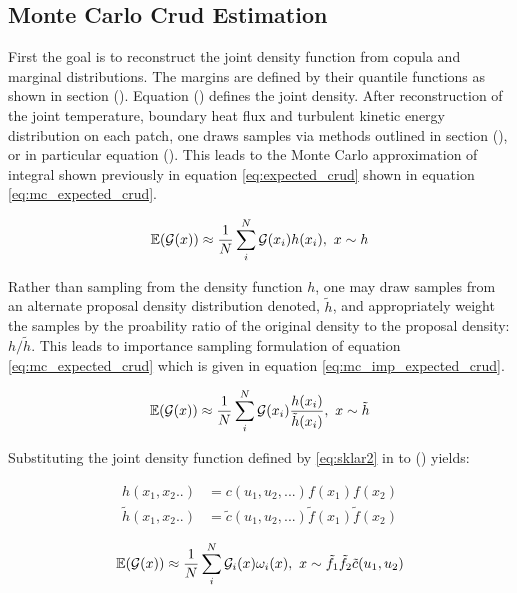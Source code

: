 

\subsection{Monte Carlo Crud Estimation}


First the goal is to reconstruct the joint density function from copula and marginal distributions.  The margins are defined by their quantile functions as shown in section ().  Equation () defines the joint density. After reconstruction of the joint temperature, boundary heat flux and turbulent kinetic energy distribution on each patch, one draws samples via methods outlined in section (), or in particular equation ().  This leads to the Monte Carlo approximation of integral shown previously in equation \ref{eq:expected_crud} shown in equation \ref{eq:mc_expected_crud}.

\begin{equation}
\operatorname*{\mathbb{E}}(\mathcal G(x)) \approx \frac{1}{N} \sum_i^N \mathcal G(x_i) h(x_i), \ x \sim {h}
\label{eq:mc_expected_crud}
\end{equation}

Rather than sampling from the density function $h$, one may draw samples from an alternate proposal density distribution denoted, $\tilde h$, and appropriately weight the samples by the proability ratio of the original density to the proposal density: $h/\tilde h$.  This leads to importance sampling formulation of equation \ref{eq:mc_expected_crud} which is given in equation \ref{eq:mc_imp_expected_crud}.

\begin{equation}
\operatorname*{\mathbb{E}}(\mathcal G(x)) \approx \frac{1}{N} \sum_i^N \mathcal G(x_i) \frac{h(x_i)}{\tilde h(x_i)}, \ x \sim \tilde{h}
\label{eq:mc_imp_expected_crud}
\end{equation}

Substituting the joint density function defined by \ref{eq:sklar2} in to () yields:

\begin{align}
    h(x_1, x_2..) &= c(u_1, u_2, ...) f(x_1) f(x_2) \nonumber \\
    \tilde h(x_1, x_2..) &= \tilde c(u_1, u_2, ...) \tilde f(x_1) \tilde f(x_2)
\label{eq:mc_imp_int_2}
\end{align}

\begin{equation}
\operatorname*{\mathbb{E}}(\mathcal G(x)) \approx \frac{1}{N} \sum_i^N \mathcal G_i(x) \omega_i(x), \ x \sim \tilde{f_1} \tilde f_2 \tilde c(u_1, u_2)
\label{eq:mc_imp_int2}
\end{equation}

